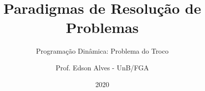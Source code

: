 \title{Paradigmas de Resolução de Problemas}
\subtitle{Programação Dinâmica: Problema do Troco}
\author{Prof. Edson Alves - UnB/FGA}
\date{2020}
